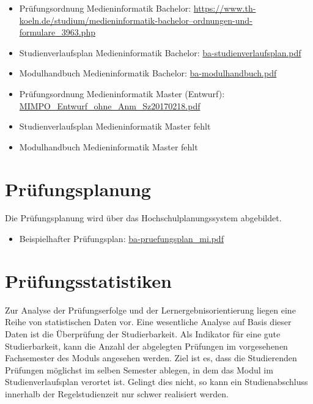 \begin{itemize}
\tightlist
\item
  Prüfungsordnung Medieninformatik Bachelor:
  \href{https://www.th-koeln.de/studium/medieninformatik-bachelor--ordnungen-und-formulare_3963.php}{https://www.th-koeln.de/studium/medieninformatik-bachelor--ordnungen-und-formulare\_3963.php}
\item
  Studienverlaufsplan Medieninformatik Bachelor:
  \href{../anhaenge/ba-studienverlaufsplan.pdf}{ba-studienverlaufsplan.pdf}
\item
  Modulhandbuch Medieninformatik Bachelor:
  \href{../anhaenge/ba-modulhandbuch.pdf}{ba-modulhandbuch.pdf}
\item
  Prüfungsordnung Medieninformatik Master (Entwurf):
  \href{../anhaenge/MIMPO_Entwurf_ohne_Anm_Sz20170218.pdf}{MIMPO\_Entwurf\_ohne\_Anm\_Sz20170218.pdf}
\item
  Studienverlaufsplan Medieninformatik Master fehlt
\item
  Modulhandbuch Medieninformatik Master fehlt
\end{itemize}

\section{Prüfungsplanung}\label{pruxfcfungsplanung}

Die Prüfungsplanung wird über das Hochschulplanungssystem abgebildet.

\begin{itemize}
\tightlist
\item
  Beispielhafter Prüfungsplan:
  \href{../anhaenge/ba-pruefungsplan_mi.pdf}{ba-pruefungsplan\_mi.pdf}
\end{itemize}

\section{Prüfungsstatistiken}\label{pruxfcfungsstatistiken}

Zur Analyse der Prüfungserfolge und der Lernergebnisorientierung liegen
eine Reihe von statistischen Daten vor. Eine wesentliche Analyse auf
Basis dieser Daten ist die Überprüfung der Studierbarkeit. Als Indikator
für eine gute Studierbarkeit, kann die Anzahl der abgelegten Prüfungen
im vorgesehenen Fachsemester des Moduls angesehen werden. Ziel ist es,
dass die Studierenden Prüfungen möglichst im selben Semester ablegen, in
dem das Modul im Studienverlaufsplan verortet ist. Gelingt dies nicht,
so kann ein Studienabschluss innerhalb der Regelstudienzeit nur schwer
realisiert werden.

